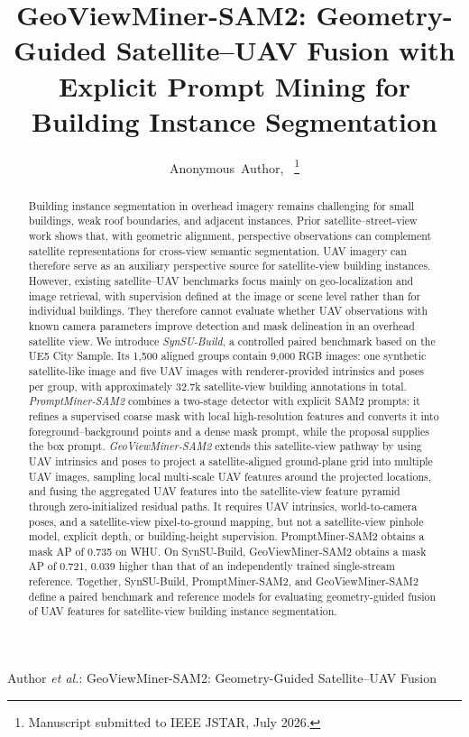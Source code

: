 \documentclass[letterpaper,journal]{IEEEtran}
\begin{document}
\title{GeoViewMiner-SAM2: Geometry-Guided Satellite--UAV Fusion with Explicit Prompt Mining for Building Instance Segmentation}

\author{Anonymous~Author,~
\thanks{Manuscript submitted to IEEE JSTAR, July 2026.}}

%
{Author \MakeLowercase{\textit{et al.}}: GeoViewMiner-SAM2: Geometry-Guided Satellite--UAV
Fusion}

\maketitle

\begin{abstract}
Building instance segmentation in overhead imagery remains challenging for small buildings,
weak roof boundaries, and adjacent instances. Prior satellite--street-view work shows that,
with geometric alignment, perspective observations can complement satellite representations for
cross-view semantic segmentation. UAV imagery can therefore serve as an auxiliary perspective
source for satellite-view building instances. However, existing satellite--UAV benchmarks focus
mainly on geo-localization and image retrieval, with supervision defined at the image or scene
level rather than for individual buildings. They therefore cannot evaluate whether UAV
observations with known camera parameters improve detection and mask delineation in an overhead
satellite view. We introduce \emph{SynSU-Build}, a controlled paired benchmark based on the UE5
City Sample. Its 1,500 aligned groups contain 9,000 RGB images: one synthetic satellite-like
image and five UAV images with renderer-provided intrinsics and poses per group, with
approximately 32.7k satellite-view building annotations in total. \emph{PromptMiner-SAM2} combines
a two-stage detector with explicit SAM2 prompts: it refines a supervised coarse mask with local
high-resolution features and converts it into foreground--background points and a dense mask
prompt, while the proposal supplies the box prompt. \emph{GeoViewMiner-SAM2} extends this
satellite-view pathway by using UAV intrinsics and poses to project a satellite-aligned ground-plane
grid into multiple UAV images, sampling local multi-scale UAV features around the projected
locations, and fusing the aggregated UAV features into the satellite-view feature pyramid through
zero-initialized residual paths. It requires UAV intrinsics, world-to-camera poses, and a
satellite-view pixel-to-ground mapping, but not a satellite-view pinhole model, explicit depth, or
building-height supervision. PromptMiner-SAM2 obtains a mask AP of 0.735 on WHU. On
SynSU-Build, GeoViewMiner-SAM2 obtains a mask AP of 0.721, 0.039 higher than that of an
independently trained single-stream reference. Together, SynSU-Build, PromptMiner-SAM2, and
GeoViewMiner-SAM2 define a paired benchmark and reference models for evaluating geometry-guided
fusion of UAV features for satellite-view building instance segmentation.
\end{abstract}
\end{document}
